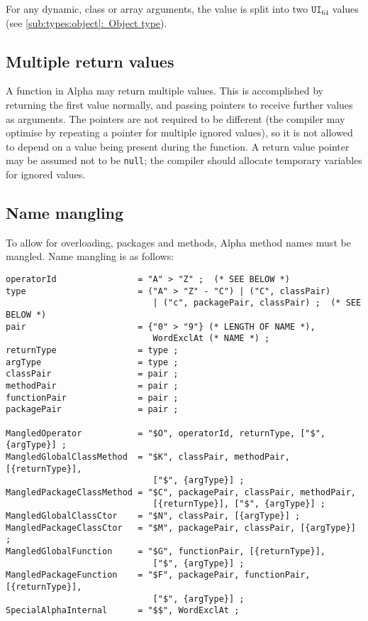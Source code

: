 \documentclass{article}
\newcommand{\R}[1]{\mathtt{#1}}
\newcommand{\textref}[2]{\hyperref[#1]{\underline{\ref*{#1}:~#2}}}
\begin{document}
For any dynamic, class or array arguments, the value is split into two
$\R{UI}_{64}$ values (see
\textref{sub:types:object}{Object type}).

\subsection{Multiple return values}
\label{sub:cconv:multiple}
A function in Alpha may return multiple values. This is accomplished by
returning the first value normally, and passing pointers to receive further
values as arguments. The pointers are not required to be different (the
compiler may optimise by repeating a pointer for multiple ignored values), so
it is not allowed to depend on a value being present during the function.
A return value pointer may be assumed not to be \texttt{null}; the compiler
should allocate temporary variables for ignored values.

\subsection{Name mangling}
\label{sub:cconv:mangling}

To allow for overloading, packages and methods, Alpha method names must be
mangled. Name mangling is as follows:

\begin{verbatim}
operatorId                = "A" > "Z" ;  (* SEE BELOW *)
type                      = ("A" > "Z" - "C") | ("C", classPair)
                             | ("c", packagePair, classPair) ;  (* SEE BELOW *)
pair                      = {"0" > "9"} (* LENGTH OF NAME *),
                             WordExclAt (* NAME *) ;
returnType                = type ;
argType                   = type ;
classPair                 = pair ;
methodPair                = pair ;
functionPair              = pair ;
packagePair               = pair ;

MangledOperator           = "$O", operatorId, returnType, ["$", {argType}] ;
MangledGlobalClassMethod  = "$K", classPair, methodPair, [{returnType}],
                             ["$", {argType}] ;
MangledPackageClassMethod = "$C", packagePair, classPair, methodPair,
                             [{returnType}], ["$", {argType}] ;
MangledGlobalClassCtor    = "$N", classPair, [{argType}] ;
MangledPackageClassCtor   = "$M", packagePair, classPair, [{argType}] ;
MangledGlobalFunction     = "$G", functionPair, [{returnType}],
                             ["$", {argType}] ;
MangledPackageFunction    = "$F", packagePair, functionPair, [{returnType}],
                             ["$", {argType}] ;
SpecialAlphaInternal      = "$$", WordExclAt ;
\end{verbatim}
\end{document}
